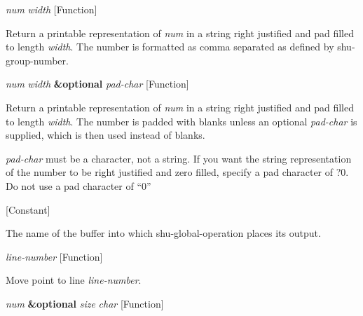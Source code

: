 \vspace{1em}
\noindent
{}
\usebox{\funcname}\emph{num} \emph{width}
 \hfill [Function]

\begin{doc-string}
Return a printable representation of \emph{num} in a string right justified
and pad filled to length \emph{width}.  The number is formatted as comma separated
as defined by shu-group-number.
\end{doc-string}

\vspace{1em}
\noindent
{}
\usebox{\funcname}\emph{num} \emph{width} \textbf{\&optional} \emph{pad-char}
 \hfill [Function]

\begin{doc-string}
Return a printable representation of \emph{num} in a string right justified and pad
filled to length \emph{width}.  The number is padded with blanks unless an optional
\emph{pad-char} is supplied, which is then used instead of blanks.

\emph{pad-char} must be a character, not a string.  If you want the string
representation of the number to be right justified and zero filled, specify a
pad character of ?0.  Do not use a pad character of ``0''
\end{doc-string}

\vspace{1em}
\noindent
{}
\usebox{\funcname}
 \hfill [Constant]

\begin{doc-string}
The name of the buffer into which shu-global-operation places its output.
\end{doc-string}

\vspace{1em}
\noindent
{}
\usebox{\funcname}\emph{line-number}
 \hfill [Function]

\begin{doc-string}
Move point to line \emph{line-number}.
\end{doc-string}

\vspace{1em}
\noindent
{}
\usebox{\funcname}\emph{num} \textbf{\&optional} \emph{size} \emph{char}
 \hfill [Function]

